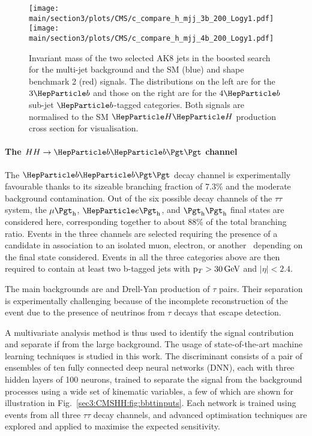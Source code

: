 \begin{figure}[!htb]
\centering 
    \texttt{[image: \\main/section3/plots/CMS/c\_compare\_h\_mjj\_3b\_200\_Logy1.pdf]}
    \texttt{[image: \\main/section3/plots/CMS/c\_compare\_h\_mjj\_4b\_200\_Logy1.pdf]}
\caption{Invariant mass of the two selected AK8 jets in the boosted \bbbb \HH search for the multi-jet background and the SM (blue) and shape benchmark 2 (red) signals.
    The distributions on the left are for the $3\PQb$ and those on the right are for the $4\PQb$ sub-jet $\PQb$-tagged categories.
    Both signals are normalised to the SM $\PH\PH$ production cross section for visualisation.} 
\label{sec3:CMSHH:fig:bbbb_boosted} 
\end{figure}



\paragraph{The $HH \rightarrow \bbtt$ channel}

The $\bbtt$ decay channel is experimentally favourable thanks to its sizeable branching fraction of 7.3\% and the moderate background contamination.
Out of the six possible decay channels of the $\tau\tau$ system, the $\mu\tauh$, $\Pe\tauh$, and $\tauh\tauh$ final states are considered here, corresponding together to about 88\% of the total branching ratio.
Events in the three channels are selected requiring the presence of a \tauh candidate in association to an isolated muon, electron, or another \tauh\ depending on the final state considered.
Events in all the three categories above are then required to contain at least two b-tagged jets with $\mathrm{p}_{T} > 30\,\text{Ge\hspace{-.08em}V}$ and $|\eta| < 2.4$. 

The main backgrounds are \ttbar and Drell-Yan production of $\tau$ pairs.
Their separation is experimentally challenging because of the incomplete reconstruction of the event due to the presence of neutrinos from $\tau$ decays that escape detection.

A multivariate analysis method is thus used to identify the signal contribution and separate if from the large background.
The usage of state-of-the-art machine learning techniques is studied in this work.
The discriminant consists of a pair of ensembles of ten fully connected deep neural networks (DNN), each with three hidden layers of 100 neurons, trained to separate the \HH signal from the background processes using a wide set of kinematic variables, a few of which are shown for illustration in Fig.~\ref{sec3:CMSHH:fig:bbttinputs}.
Each network is trained using events from all three $\tau\tau$ decay channels, and advanced optimisation techniques are explored and applied to maximise the expected sensitivity.

